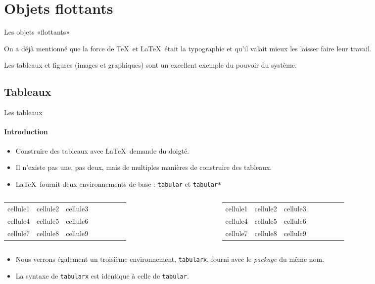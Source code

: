 \section{Objets flottants}

\begin{frame}[c]{Les objets «flottants»}

	On a déjà mentionné que la force de \TeX\ et \LaTeX\ était la typographie et qu'il valait mieux les laisser faire leur travail.
	
	Les tableaux et figures (images et graphiques) sont un excellent exemple du pouvoir du système.
\end{frame}

\subsection{Tableaux}

\begin{frame}[fragile,c]{Les tableaux}
	\framesubtitle{Introduction}
	
	\begin{itemize}
		\item Construire des tableaux avec \LaTeX\ demande du doigté.
		\item Il n'existe pas une, pas deux, mais de multiples manières de construire des tableaux.
		\item \LaTeX\ fournit deux environnements de base : \texttt{tabular} et \texttt{tabular*}
	\end{itemize}

	\begin{columns}
		\begin{column}{.49\textwidth}
\begin{codesource}
	\begin{tabular}{colonnes}
		cellule1 & cellule2 & cellule3 \\
		cellule4 & cellule5 & cellule6 \\
		cellule7 & cellule8 & cellule9
	\end{tabular}
\end{codesource}
		\end{column}
		\begin{column}{.49\textwidth}
\begin{codesource}
	\begin{tabular*}{largeur}{colonnes}
		cellule1 & cellule2 & cellule3 \\
		cellule4 & cellule5 & cellule6 \\
		cellule7 & cellule8 & cellule9
	\end{tabular*}
\end{codesource}
		\end{column}
	\end{columns}

	\begin{itemize}
		\item Nous verrons également un troisième environnement, \texttt{tabularx}, fourni avec
		le \emph{package} du même nom.
		\item La syntaxe de \texttt{tabularx} est identique à celle de \texttt{tabular}.
	\end{itemize}
\end{frame}

